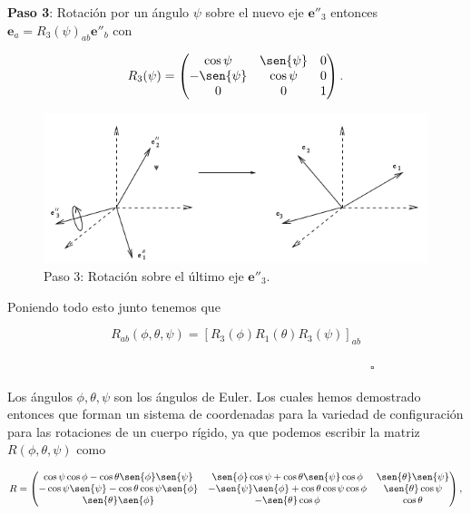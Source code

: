 \documentclass[a4paper,10pt]{article}
\numberwithin{equation}{section}
\begin{document}
\textbf{Paso 3}: Rotación por un ángulo $\psi$ sobre el nuevo eje $\mathbf{e}''_3$ 
entonces $\mathbf{e}_a = R_3(\psi)_{ab}\mathbf{e}''_b$ con 

\begin{equation}
 R_3(\psi) = \begin{pmatrix}
              \cos{\psi} & \sen{\psi} & 0 \\
	      -\sen{\psi} & \cos{\psi} & 0 \\
	      0 & 0 & 1
	     \end{pmatrix}.
\end{equation}

\begin{figure}[H]
  \center 
  \includegraphics[scale=0.66]{problema5fig4}
  \caption{Paso 3: Rotación sobre el último eje $\mathbf{e}''_3$.}
\end{figure}


Poniendo todo esto junto tenemos que 

\begin{equation}
 R_{ab} (\phi,\theta,\psi) = [R_3(\phi)R_1(\theta)R_3(\psi)]_{ab}
\end{equation}

$\hspace{12cm} \square$

Los ángulos $\phi,\theta,\psi$ son los ángulos de Euler. Los cuales hemos demostrado 
entonces que forman un sistema de coordenadas para la variedad de configuración 
para las rotaciones de un cuerpo rígido, ya que podemos escribir la matriz $R(\phi,\theta,\psi)$
como 

\begin{equation*}
 R  = \begin{pmatrix}
              \cos{\psi}\cos{\phi} - \cos{\theta}\sen{\phi}\sen{\psi} & 
              \sen{\phi}\cos{\psi} + \cos{\theta}\sen{\psi}\cos{\phi} & 
              \sen{\theta}\sen{\psi} \\
	      -\cos{\psi}\sen{\psi} - \cos{\theta}\cos{\psi}\sen{\phi} & 
	      -\sen{\psi}\sen{\phi} + \cos{\theta}\cos{\psi}\cos{\phi} & 
	      \sen{\theta}\cos{\psi} \\
	      \sen{\theta}\sen{\phi} & -\sen{\theta}\cos{\phi} & \cos{\theta}
	     \end{pmatrix},
\end{equation*}
\end{document}
